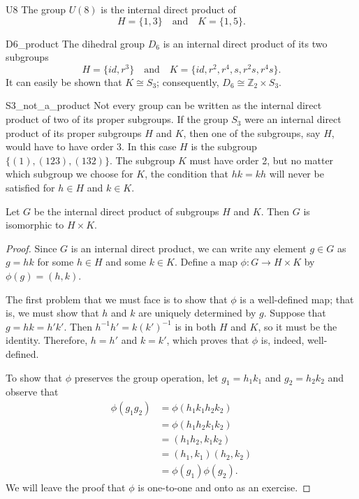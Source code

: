  
\begin{example}{U8}
The group $U(8)$ is the internal direct product of
\[
H  = \{1, 3 \} \quad \text{and} \quad K  = \{1, 5 \}.
\]
\end{example}

 
\begin{example}{D6_product}
The dihedral group $D_6$ is an internal direct product of its two
subgroups 
\[
H  = \{id, r^3  \} \quad \text{and} \quad
K  = \{id, r^2, r^4, s, r^2s, r^4 s   \}.
\]
It can easily be shown that $K \cong S_3$; consequently, $D_6 \cong
{\mathbb Z}_2 \times S_3$. 
\end{example}

 
\begin{example}{S3_not_a_product}
Not every group can be written as the internal direct product of two
of its proper subgroups.  If the group $S_3$ were an internal direct
product of its proper subgroups $H$ and $K$, then one of the  subgroups,
say $H$, would have to have order 3. In this case $H$ is the subgroup $\{
(1), (123), (132) \}$. The subgroup $K$ must have order 2, but no
matter which subgroup we choose for $K$, the condition that $hk = kh$
will never be satisfied for $h \in H$ and $k \in K$.
\mbox{\hspace{1in}}
\end{example}

 
\begin{theorem}\label{isomorph:directproducts}
Let $G$ be the internal direct product of  subgroups $H$ and $K$. Then
$G$ is isomorphic to $H \times K$. 
\end{theorem}
 

\begin{proof}
Since $G$ is an internal direct product, we can write any element $g
\in G$ as $g =hk$ for some $h \in H$ and some $k \in K$. Define a map
$\phi : G \rightarrow H \times K$ by $\phi(g) = (h,k)$.

 
The first problem that we must face is to show that $\phi$ is a
well-defined map; that is, we must show that $h$ and $k$ are uniquely
determined by $g$. Suppose that $g = hk=h'k'$. Then $h^{-1} h'= k
(k')^{-1}$ is in both $H$ and $K$, so it must be the identity.
Therefore, $h = h'$ and $k = k'$, which proves that $\phi$ is, indeed,
well-defined. 

 
To show that $\phi$ preserves the group operation, let $g_1 = h_1 k_1$
and $g_2 = h_2 k_2$ and observe that 
\begin{align*}
\phi( g_1 g_2 ) & = \phi( h_1 k_1 h_2 k_2 )\\
& = \phi(h_1  h_2 k_1 k_2) \\
& = (h_1  h_2, k_1 k_2) \\
& = (h_1, k_1)( h_2, k_2) \\
& = \phi( g_1 ) \phi(  g_2 ).
\end{align*}
We will leave the proof that $\phi$ is one-to-one and onto
as an exercise.
\end{proof}

